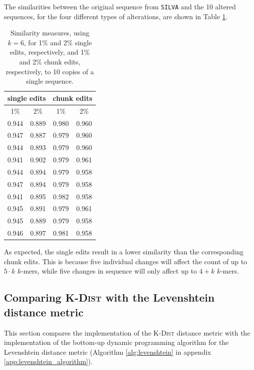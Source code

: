 The similarities between the original sequence from \texttt{SILVA} and the 10
altered sequences, for the four different types of alterations, are shown in
Table \ref{tab:altered_seqs_similarities}.

\begin{table}[H]
  \centering
  \begin{tabular}{c|c||c|c}
    \multicolumn{2}{c||}{single edits}  & \multicolumn{2}{c}{chunk edits} \\
    \hline\hline
    1\%   &   2\%                   &   1\%   &   2\% \\
    \hline
    0.944   & 0.889                     & 0.980     & 0.960 \\
    0.947   & 0.887                     & 0.979     & 0.960 \\
    0.944   & 0.893                     & 0.979     & 0.960 \\
    0.941   & 0.902                     & 0.979     & 0.961 \\
    0.944   & 0.894                     & 0.979     & 0.958 \\
    0.947   & 0.894                     & 0.979     & 0.958 \\
    0.941   & 0.895                     & 0.982     & 0.958 \\
    0.945   & 0.891                     & 0.979     & 0.961 \\
    0.945   & 0.889                     & 0.979     & 0.958 \\
    0.946   & 0.897                     & 0.981     & 0.958
  \end{tabular}
  \caption{Similarity measures, using $k=6$, for 1\% and 2\% single edits,
    respectively, and 1\% and 2\% chunk edits, respectively, to 10 copies of a
    single sequence.}
  \label{tab:altered_seqs_similarities}
\end{table}

As expected, the single edits result in a lower similarity than the
corresponding chunk edits. This is because five individual changes will affect
the count of up to $5 \cdot k$ $k$-mers, while five changes in sequence will
only affect up to $4+k$ $k$-mers.


\subsection{Comparing \textsc{K-Dist} with the Levenshtein distance metric}
\label{sec:kdist_vs_levenshtein}

This section compares the implementation of the \textsc{K-Dist} distance
metric with the implementation of the bottom-up dynamic programming algorithm
for the Levenshtein distance metric (Algorithm \ref{alg:levenshtein} in
appendix \ref{app:levenshtein_algorithm}).


